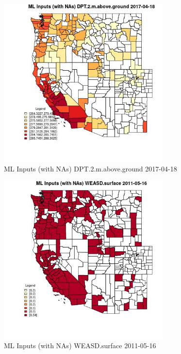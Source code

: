 \begin{figure} 
\centering  
\includegraphics[width=0.77\textwidth]{Code_Outputs/Report_ML_input_PM25_Step4_part_e_de_duplicated_aves_compiled_2019-05-21wNAs_CountyDPT2mabovegroundMean2017-04-18.jpg} 
\caption{\label{fig:Report_ML_input_PM25_Step4_part_e_de_duplicated_aves_compiled_2019-05-21wNAsCountyDPT2mabovegroundMean2017-04-18}ML Inputs (with NAs) DPT.2.m.above.ground 2017-04-18} 
\end{figure} 
 

\begin{figure} 
\centering  
\includegraphics[width=0.77\textwidth]{Code_Outputs/Report_ML_input_PM25_Step4_part_e_de_duplicated_aves_compiled_2019-05-21wNAs_CountyWEASDsurfaceMean2011-05-16.jpg} 
\caption{\label{fig:Report_ML_input_PM25_Step4_part_e_de_duplicated_aves_compiled_2019-05-21wNAsCountyWEASDsurfaceMean2011-05-16}ML Inputs (with NAs) WEASD.surface 2011-05-16} 
\end{figure} 
 

